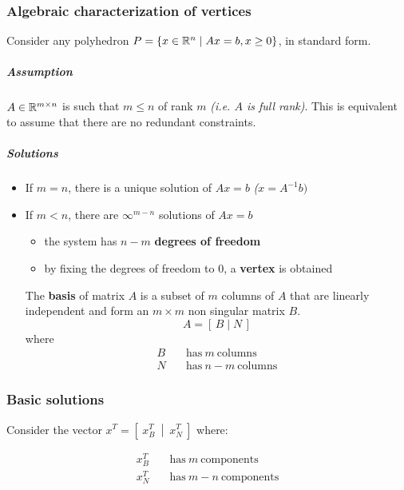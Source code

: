 \documentclass[english]{article}
\begin{document}
\subsubsection{Algebraic characterization of vertices}

Consider any polyhedron \(P = \left\{ x \in \mathbb{R}^n \mid   Ax = b, x \geq 0 \right\}\), in standard form.

\subparagraph*{Assumption}
\(A \in \mathbb{R}^{m \times n}\) is such that \(m \leq n\) of rank \(m\) \textit{(i.e. \(A\) is full rank)}.
This is equivalent to assume that there are no redundant constraints.

\subparagraph*{Solutions}
\begin{itemize}
  \item If \(m = n\), there is a unique solution of \(Ax = b\) \textit{(\(x = A^{-1} b)\)}
  \item If \(m < n\), there are \(\infty^{m-n}\) solutions of \(Ax = b\)
        \begin{itemize}
          \item the system has \(n-m\) \textbf{degrees of freedom}
          \item by fixing the degrees of freedom to \(0\), a \textbf{vertex} is obtained
        \end{itemize}

        The \textbf{basis} of matrix \(A\) is a subset of \(m\) columns of \(A\) that are linearly independent and form an \(m \times m\) non singular matrix \(B\).
        \[ A = [\, B \mid N \, ] \]
        where
        \begin{align*}
          B \quad & \text{has} \ m \ \text{columns}   \\
          N \quad & \text{has} \ n-m \ \text{columns}
        \end{align*}
\end{itemize}

\subsubsection{Basic solutions}
\label{sec:basic-solutions}

Consider the vector \(x^T = \left[ \ x_B^T \ \middle\vert \ x_N^T \ \right]\) where:

\begin{align*}
  x_B^T \quad & \text{has} \ m \ \text{components}   \\
  x_N^T \quad & \text{has} \ m-n \ \text{components}
\end{align*}
\end{document}
